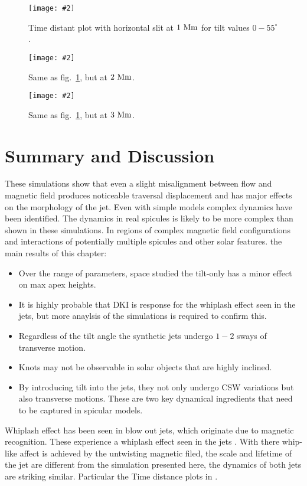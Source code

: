\documentclass[12pt]{ociamthesis}
\newcommand{\mfig}[4]{
  \begin{figure}
  \begin{center}
  \texttt{[image: \#2]}
  \caption{#3}
  \label{#4}
  \end{center}
  \end{figure}}
\begin{document}
\mfig{1}{figures/td_plot_1Mm.png}{Time distant plot with horizontal slit at $1~\rm{Mm}$ for tilt values $0-55^{\circ}$.}{td_plot_1Mm}
%
\mfig{1}{figures/td_plot_2Mm.png}{Same as fig.~\ref{td_plot_1Mm}, but at $2~\rm{Mm}$.}{td_plot_2Mm}
\mfig{1}{figures/td_plot_3Mm.png}{Same as fig.~\ref{td_plot_1Mm}, but at $3~\rm{Mm}$.}{td_plot_3Mm}
\section{Summary and Discussion}
\label{sec:sum}
These simulations show that even a slight misalignment between flow and magnetic field produces noticeable traversal displacement and has major effects on the morphology of the jet. Even with simple models complex dynamics have been identified. The dynamics in real spicules is likely to be more complex than shown in these simulations. In regions of complex  magnetic field configurations and interactions of potentially multiple spicules and other solar features. the main results of this chapter: 
\begin{itemize}
\item Over the range of parameters, space studied the tilt-only has a minor effect on max apex heights.
\item It is highly probable that DKI is response for the whiplash effect seen in the jets, but more anaylsis of the simulations is required to confirm this.
\item Regardless of the tilt angle the synthetic jets undergo $1-2$ sways of transverse motion.
\item Knots may not be observable in solar objects that are highly inclined.
\item By introducing tilt into the jets, they not only undergo CSW variations but also transverse motions. These are two key dynamical ingredients that need to be captured in spicular models.
\end{itemize}
Whiplash effect has been seen in blow out jets, which originate due to magnetic recognition. These experience a whiplash effect seen in the jets \citep{Canfield1996ApJ4641016C,Liu2009ApJ707L37L}. With there whip-like affect is achieved by the untwisting magnetic filed, the scale and lifetime of the jet are different from the simulation presented here, the dynamics of both jets are striking similar. Particular the Time distance plots in \cite{Liu2009ApJ707L37L}.



  
\end{document}
